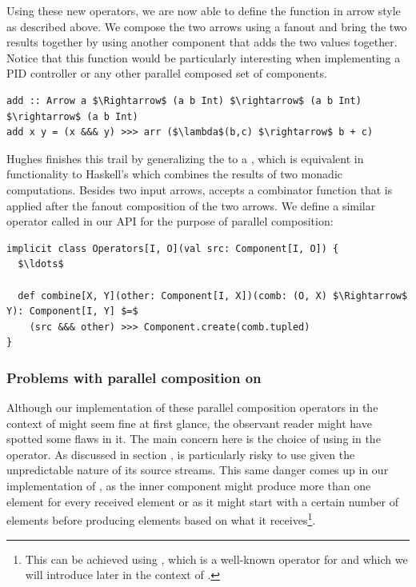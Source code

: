 Using these new operators, we are now able to define the  function in arrow style as described above. We compose the two arrows using a fanout and bring the two results together by using another component that adds the two values together. Notice that this function would be particularly interesting when implementing a PID controller or any other parallel composed set of components.

\begin{lstlisting}[style=InlineHaskellStyle]
add :: Arrow a $\Rightarrow$ (a b Int) $\rightarrow$ (a b Int) $\rightarrow$ (a b Int)
add x y = (x &&& y) >>> arr ($\lambda$(b,c) $\rightarrow$ b + c)
\end{lstlisting}

Hughes finishes this trail by generalizing the  to a , which is equivalent in functionality to Haskell's  which combines the results of two monadic computations. Besides two input arrows,  accepts a combinator function that is applied after the fanout composition of the two arrows. We define a similar operator called  in our API for the purpose of parallel composition:

\begin{minipage}{\linewidth}
\begin{lstlisting}[style=ScalaStyle, caption={Implementation of the \code{Arrow}'s \code{liftA2} or \code{combine} operator}, label={lst:combine-operator}]
implicit class Operators[I, O](val src: Component[I, O]) {
  $\ldots$

  def combine[X, Y](other: Component[I, X])(comb: (O, X) $\Rightarrow$ Y): Component[I, Y] $=$
    (src &&& other) >>> Component.create(comb.tupled)
}
\end{lstlisting}
\end{minipage}

\subsubsection{Problems with parallel composition on \comp}
Although our implementation of these parallel composition operators in the context of \comp might seem fine at first glance, the observant reader might have spotted some flaws in it. The main concern here is the choice of using  in the  operator. As discussed in section ,  is particularly risky to use given the unpredictable nature of its source streams. This same danger comes up in our implementation of , as the inner component might produce more than one element for every received element or as it might start with a certain number of elements before producing elements based on what it receives\footnote{This can be achieved using , which is a well-known operator for \obs and which we will introduce later in the context of \comp.}.


